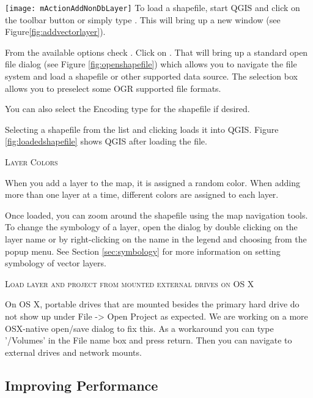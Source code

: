 \texttt{[image: mActionAddNonDbLayer]} To load a shapefile, start
QGIS and click on the 
toolbar button or simply type . 
This will bring up a new window (see Figure\ref{fig:addvectorlayer}).  

From the available options check . Click on . 
That will bring up a standard open file dialog (see Figure
\ref{fig:openshapefile}) which allows you to navigate the file system and load
a shapefile or other supported data source. 
The selection box  allows you to preselect some OGR supported file formats.

You can also select the Encoding type for the shapefile if desired.

Selecting a shapefile from the list and clicking  loads it into QGIS. Figure
\ref{fig:loadedshapefile} shows QGIS after loading the  file.


\begin{Tip}\caption{\textsc{Layer Colors}}
When you add a layer to the map, it is assigned a random color. When
adding more than one layer at a time, different colors are assigned to each layer.
\end{Tip}

Once loaded, you can zoom around the shapefile using the map navigation tools.
To change the symbology of a layer, open the  dialog by double
clicking on the layer name or by right-clicking on the name in the legend and
choosing  from the popup menu. See
Section \ref{sec:symbology} for more information on setting symbology of
vector layers.
 
\begin{Tip}\caption{\textsc{Load layer and project from mounted external
drives on OS X}}
On OS X, portable drives that are mounted besides the primary hard
drive do not show up under File -> Open Project as expected. We are working
on a more OSX-native open/save dialog to fix this. As a workaround you can
type '/Volumes' in the File name box and press return. Then you can navigate
to external drives and network mounts.
\end{Tip}
 
\subsection{Improving Performance}

